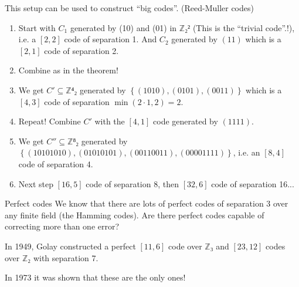\documentclass[english]{lbscript}
\begin{document}
\begin{remark}{}{}
	This setup can be used to construct \enquote{big codes}. (Reed-Muller codes)

	\begin{enumerate}
		\item\label{item:82} Start with \(C_1\) generated by (10) and (01) in \(ℤ₂²\) (This is the \enquote{trivial code}.!), i.e. a \([2,2]\) code of separation 1. And \(C_2\) generated by \((11)\) which is a \([2,1]\) code of separation 2.
		\item\label{item:83} Combine as in the theorem!
		\item\label{item:84} We get \(C'⊆ℤ⁴₂\) generated by \(\left\{ (1010), (0101),(0011) \right\} \) which is a \([4,3]\) code of separation \(\min(2⋅1, 2)=2\).
		\item\label{item:85} Repeat! Combine \(C'\) with the \([4,1]\) code generated by \((1111)\).
		\item\label{item:86} We get \(C''⊆ℤ⁸₂\) generated by \(\left\{ (10101010), (01010101), (00110011), (00001111) \right\} \), i.e. an \([8,4]\) code of separation 4.
		\item\label{item:87} Next step \([16,5]\) code of separation 8, then \([32, 6]\) code of separation 16...
	\end{enumerate}
\end{remark}
\begin{remark}{Perfect codes}{}
	We know that there are lots of perfect codes of separation 3 over any finite field (the Hamming codes). Are there perfect codes capable of correcting more than one error?

	In 1949, Golay constructed a perfect \([11,6]\) code over \(ℤ₃\) and \([23,12]\) codes over \(ℤ₂\) with separation 7.

	In 1973 it was shown that these are the only ones!
\end{remark}
\end{document}
